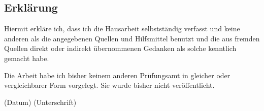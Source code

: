 \thispagestyle{empty}
\subsection*{Erklärung}
Hiermit erkläre ich, dass ich die Hausarbeit selbstständig
verfasst und keine anderen als die angegebenen Quellen und Hilfsmittel benutzt
und die aus fremden Quellen direkt oder indirekt übernommenen Gedanken als
solche kenntlich gemacht habe.

Die Arbeit habe ich bisher keinem anderen Prüfungsamt in gleicher oder
vergleichbarer Form vorgelegt. Sie wurde bisher nicht veröffentlicht.


\vspace{3cm}
\begin{center}
(Datum) \hspace{8cm} (Unterschrift)
\end{center}
